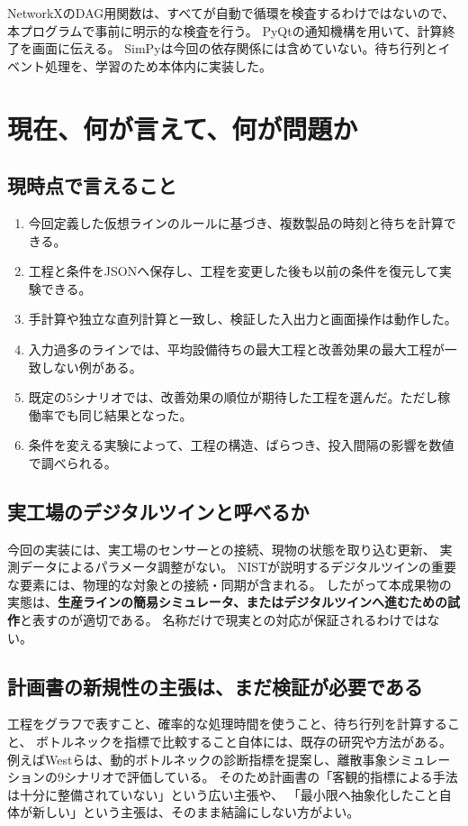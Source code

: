 \documentclass[a4paper,11pt]{ltjsarticle}
\newcommand{\term}[1]{\textbf{#1}}
\begin{document}
NetworkXのDAG用関数は、すべてが自動で循環を検査するわけではないので、
本プログラムで事前に明示的な検査を行う\cite{networkx}。
PyQtの通知機構を用いて、計算終了を画面に伝える\cite{pyqt}。
SimPyは今回の依存関係には含めていない。待ち行列とイベント処理を、学習のため本体内に実装した。

\clearpage
\section{現在、何が言えて、何が問題か}
\subsection{現時点で言えること}
\begin{enumerate}
\item 今回定義した仮想ラインのルールに基づき、複数製品の時刻と待ちを計算できる。
\item 工程と条件をJSONへ保存し、工程を変更した後も以前の条件を復元して実験できる。
\item 手計算や独立な直列計算と一致し、検証した入出力と画面操作は動作した。
\item 入力過多のラインでは、平均設備待ちの最大工程と改善効果の最大工程が一致しない例がある。
\item 既定の5シナリオでは、改善効果の順位が期待した工程を選んだ。ただし稼働率でも同じ結果となった。
\item 条件を変える実験によって、工程の構造、ばらつき、投入間隔の影響を数値で調べられる。
\end{enumerate}

\subsection{実工場のデジタルツインと呼べるか}
今回の実装には、実工場のセンサーとの接続、現物の状態を取り込む更新、
実測データによるパラメータ調整がない。
NISTが説明するデジタルツインの重要な要素には、物理的な対象との接続・同期が含まれる\cite{nist}。
したがって本成果物の実態は、\term{生産ラインの簡易シミュレータ、またはデジタルツインへ進むための試作}と表すのが適切である。
名称だけで現実との対応が保証されるわけではない。

\subsection{計画書の新規性の主張は、まだ検証が必要である}
工程をグラフで表すこと、確率的な処理時間を使うこと、待ち行列を計算すること、
ボトルネックを指標で比較すること自体には、既存の研究や方法がある。
例えばWestらは、動的ボトルネックの診断指標を提案し、離散事象シミュレーションの9シナリオで評価している\cite{west}。
そのため計画書の「客観的指標による手法は十分に整備されていない」という広い主張や、
「最小限へ抽象化したこと自体が新しい」という主張は、そのまま結論にしない方がよい。
\end{document}
